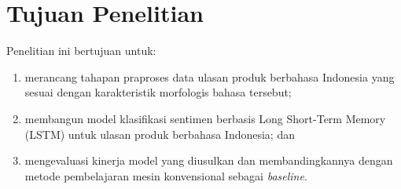 
\chapter{Tujuan Penelitian}

Penelitian ini bertujuan untuk:
\begin{enumerate}
  \item merancang tahapan praproses data ulasan produk berbahasa
        Indonesia yang sesuai dengan karakteristik morfologis bahasa
        tersebut;
  \item membangun model klasifikasi sentimen berbasis Long Short-Term
        Memory (LSTM) untuk ulasan produk berbahasa Indonesia; dan
  \item mengevaluasi kinerja model yang diusulkan dan membandingkannya
        dengan metode pembelajaran mesin konvensional sebagai
        \textit{baseline}.
\end{enumerate}
